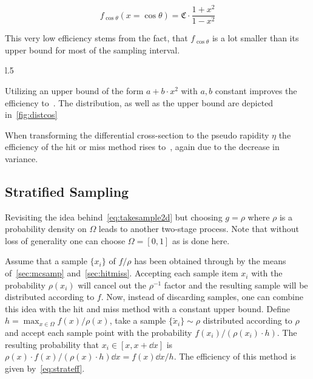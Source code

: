 \begin{equation}
  \label{eq:distcos}
  f_{\cos\theta}(x=\cos\theta) = \mathfrak{C}\cdot\frac{1+x^2}{1-x^2}
\end{equation}

This very low efficiency stems from the fact, that \(f_{\cos\theta}\)
is a lot smaller than its upper bound for most of the sampling
interval.

\begin{wrapfigure}{l}{.5\textwidth}
  \caption{\label{fig:distcos} The distribution~\eqref{eq:distcos} and an upper bound of
    the form \(a + b\cdot x^2\).}
\end{wrapfigure}

Utilizing an upper bound of the form \(a + b\cdot x^2\) with \(a, b\)
constant improves the efficiency
to~. The distribution, as well as the
upper bound are depicted in~\ref{fig:distcos}

When transforming the differential cross-section to the pseudo
rapidity \(\eta\) the efficiency of the hit or miss method rises
to~, again due to the decrease in variance.

\subsection{Stratified Sampling}%
\label{sec:stratsamp}

Revisiting the idea behind~\eqref{eq:takesample2d} but choosing
\(g=\rho\) where \(\rho\) is a probability density on \(\Omega\)
leads to another two-stage process. Note that without loss of
generality one can choose \(\Omega = [0, 1]\) as is done here.

Assume that a sample \(\{x_i\}\) of \(f/\rho\) has been obtained
through by the means of~\ref{sec:mcsamp}
and~\ref{sec:hitmiss}. Accepting each sample item \(x_i\) with the
probability \(\rho(x_i)\) will cancel out the \(\rho^{-1}\) factor and
the resulting sample will be distributed according to \(f\). Now,
instead of discarding samples, one can combine this idea with the hit
and miss method with a constant upper bound. Define
\(h=\max_{x\in\Omega}f(x)/\rho(x)\), take a sample
\(\{\tilde{x}_i\}\sim\rho\) distributed according to \(\rho\) and accept
each sample point with the probability \(f(x_i)/(\rho(x_i)\cdot
h)\). The resulting probability that \(x_i\in[x, x+\dd{x}]\) is
\(\rho(x)\cdot f(x)/(\rho(x)\cdot h)\dd{x}=f(x)\dd{x}/h\). The efficiency
of this method is given by~\eqref{eq:strateff}.

